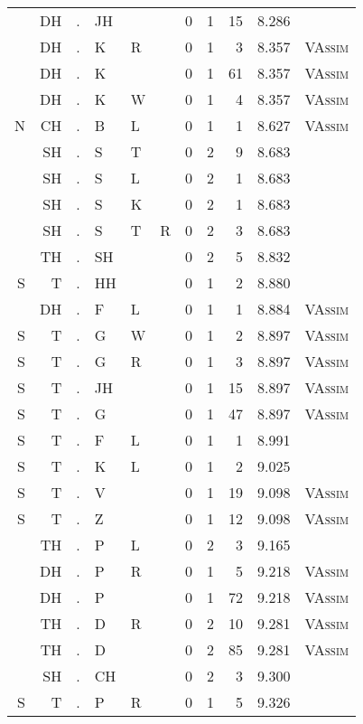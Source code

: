 \begin{longtable}{r@{ } r@{ } c@{ } l@{ } l@{ } l@{ } r r r r l }
  & DH & . & JH &   &   & 0 & 1 & 15 & 8.286 &  \\
  & DH & . & K & R &   & 0 & 1 & 3 & 8.357 & \textsc{VAssim} \\
  & DH & . & K &   &   & 0 & 1 & 61 & 8.357 & \textsc{VAssim} \\
  & DH & . & K & W &   & 0 & 1 & 4 & 8.357 & \textsc{VAssim} \\
N & CH & . & B & L &   & 0 & 1 & 1 & 8.627 & \textsc{VAssim} \\
  & SH & . & S & T &   & 0 & 2 & 9 & 8.683 &  \\
  & SH & . & S & L &   & 0 & 2 & 1 & 8.683 &  \\
  & SH & . & S & K &   & 0 & 2 & 1 & 8.683 &  \\
  & SH & . & S & T & R & 0 & 2 & 3 & 8.683 &  \\
  & TH & . & SH &   &   & 0 & 2 & 5 & 8.832 &  \\
S & T & . & HH &   &   & 0 & 1 & 2 & 8.880 &  \\
  & DH & . & F & L &   & 0 & 1 & 1 & 8.884 & \textsc{VAssim} \\
S & T & . & G & W &   & 0 & 1 & 2 & 8.897 & \textsc{VAssim} \\
S & T & . & G & R &   & 0 & 1 & 3 & 8.897 & \textsc{VAssim} \\
S & T & . & JH &   &   & 0 & 1 & 15 & 8.897 & \textsc{VAssim} \\
S & T & . & G &   &   & 0 & 1 & 47 & 8.897 & \textsc{VAssim} \\
S & T & . & F & L &   & 0 & 1 & 1 & 8.991 &  \\
S & T & . & K & L &   & 0 & 1 & 2 & 9.025 &  \\
S & T & . & V &   &   & 0 & 1 & 19 & 9.098 & \textsc{VAssim} \\
S & T & . & Z &   &   & 0 & 1 & 12 & 9.098 & \textsc{VAssim} \\
  & TH & . & P & L &   & 0 & 2 & 3 & 9.165 &  \\
  & DH & . & P & R &   & 0 & 1 & 5 & 9.218 & \textsc{VAssim} \\
  & DH & . & P &   &   & 0 & 1 & 72 & 9.218 & \textsc{VAssim} \\
  & TH & . & D & R &   & 0 & 2 & 10 & 9.281 & \textsc{VAssim} \\
  & TH & . & D &   &   & 0 & 2 & 85 & 9.281 & \textsc{VAssim} \\
  & SH & . & CH &   &   & 0 & 2 & 3 & 9.300 &  \\
S & T & . & P & R &   & 0 & 1 & 5 & 9.326 &  \\

\end{longtable}
